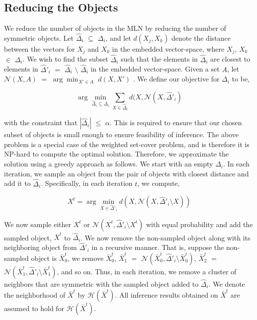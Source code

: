 \subsection{Reducing the Objects}

We reduce the number of objects in the MLN by reducing the number of symmetric objects. Let $\hat{\Delta}_i$  $\subseteq$ $\Delta_i$, and let $d(X_j,X_k)$ denote the distance between the vectors for $X_j$ and $X_k$ in the embedded vector-space, where $X_j$, $X_k$ $\in$ $\Delta_i$. We wish to find the subset $\hat{\Delta}_i$ such that the elements in $\hat{\Delta}_i$ are closest to elements in  $\hat{\Delta}'_i$ $=$ $\hat{\Delta}_i$ $\setminus$ $\hat{\Delta}_i$ in the embedded vector-space. Given a set $A$, let $\mathcal{N}(X,A)$ $=$ $\arg\min_{X'\in A}$ $d(X,X')$ . We define our objective for $\Delta_i$ to be,

\begin{equation}
\arg\min_{\hat{\Delta}_i\subseteq\Delta_i}\sum_{X\in\hat{\Delta}_i} d(X,\mathcal{N}(X,\hat{\Delta}'_i)
\end{equation}

with the constraint that $|\hat{\Delta}_i|$ $\leq$ $\alpha$. This is required to ensure that our chosen subset of objects is small enough to ensure feasibility of inference. The above problem is a special case of the weighted set-cover problem, and is therefore it is NP-hard to compute the optimal solution. Therefore, we approximate the solution using a greedy approach as follows. We start with an empty $\hat{\Delta}_i$. In each iteration, we sample an object from the pair of objects with closest distance and add it to $\hat{\Delta}_i$. Specifically, in each iteration $t$, we compute,


\begin{equation}
X^t = \arg\min_{X\in\hat{\Delta}'_i}d(X,\mathcal{N}(X,\hat{\Delta}'_i\setminus{X}))
\end{equation}

We now sample either $X^t$ or $\mathcal{N}(X^t,\hat{\Delta}'_i\setminus{X^t})$ with equal probability and add the sampled object, $\bar{X}^t$ to $\hat{\Delta}_i$. We now remove the non-sampled object along with its neighboring object from $\hat{\Delta}'_i$ in a recursive manner. That is, suppose the non-sampled object is $\bar{X}^t_0$, we remove $\bar{X}^t_0$, $\bar{X}^t_1$ $=$ $\mathcal{N}(\bar{X}^t_0,\hat{\Delta}'_i\setminus{\bar{X}^t_0})$, $\bar{X}^t_2$ $=$ $\mathcal{N}(\bar{X}^t_1,\hat{\Delta}'_i\setminus{\bar{X}^t_1})$, and so on. Thus, in each iteration, we remove a cluster of neighbors that are symmetric with the sampled object added to $\hat{\Delta}_i$. We denote the neighborhood of $\bar{X}^t$ by $\mathcal{H}(\bar{X}^t)$. All inference results obtained on $\bar{X}^t$ are assumed to hold for $\mathcal{H}(\bar{X}^t)$.

